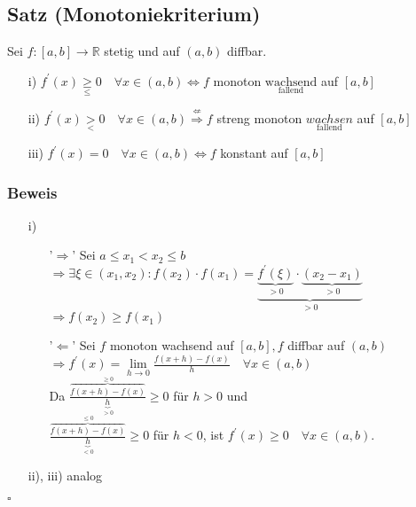 \documentclass[12pt, titlepage]{article}
\newcommand{\R}{\mathds{R}}
\renewcommand{\>}{\rightarrow}
\renewcommand{\*}{\cdot}
\begin{document}
	\subsection{Satz (Monotoniekriterium)}
	Sei $f\colon[a,b]\>\R$ stetig und auf $(a,b)$ diffbar.
	\begin{itemize}
		\item[i)] $f^\prime(x)\underset{\leq}{\geq}0\quad\forall x\in(a,b)\Leftrightarrow f$ monoton $\underset{\textrm{fallend}}{\textrm{wachsend}}$ auf $[a,b]$
		\item[ii)] $f^\prime(x)\underset{<}{>}0\quad\forall x\in(a,b) \overset{\nLeftarrow}{\Rightarrow} f$ streng monoton $\underset{\textrm{fallend}}{wachsen}$ auf $[a,b]$
		\item[iii)] $f^\prime(x)=0\quad\forall x\in(a,b)\Leftrightarrow f$ konstant auf $[a,b]$		
	\end{itemize}
	\subsubsection*{Beweis}
	\begin{itemize}
		\item[i)] \begin{itemize}
			\item['$\Rightarrow$'] Sei $a\leq x_1<x_2\leq b$\\
			$\Rightarrow\exists\xi\in(x_1,x_2)\colon f(x_2)\*f(x_1)=\underbrace{\underbrace{f^\prime(\xi)}_{>0}\*\underbrace{(x_2-x_1)}_{>0}}_{>0}$\\
			$\Rightarrow f(x_2)\geq f(x_1)$
			\item['$\Leftarrow$'] Sei $f$ monoton wachsend auf $[a,b], f$ diffbar auf $(a,b)$\\
			$\Rightarrow f^\prime(x)=\lim\limits_{h\>0}\frac{f(x+h)-f(x)}{h}\quad\forall x\in(a,b)$\\
			Da $\frac{\overbrace{f(x+h)-f(x)}^{\geq0}}{\underbrace{h}_{>0}}\geq0$ für $h>0$ und\\
			$\frac{\overbrace{f(x+h)-f(x)}^{\leq0}}{\underbrace{h}_{<0}}\geq0$ für $h<0$, ist $f^\prime(x)\geq0\quad\forall x\in(a,b)$.
		\end{itemize}
		\item[ii), iii)] analog
	\end{itemize}
	\hfill$\square$
\end{document}

